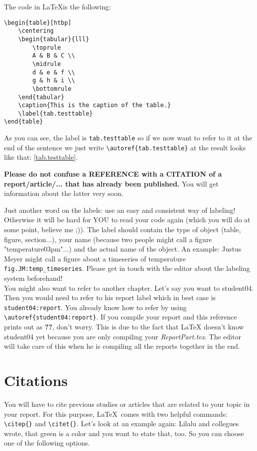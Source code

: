 \documentclass[12pt,a4paper,notitlepage]{scrreprt}
\begin{document}
The code in \LaTeX is the following:

\begin{verbatim}
\begin{table}[htbp]
    \centering
    \begin{tabular}{lll}
        \toprule
        A & B & C \\
        \midrule
        d & e & f \\
        g & h & i \\
        \bottomrule
    \end{tabular}
    \caption{This is the caption of the table.}
    \label{tab.testtable}
\end{table}
\end{verbatim}

As you can see, the label is \verb#tab.testtable# so if we now want to refer to it at the end of the sentence we just write \verb#\autoref{tab.testtable}# at the result looks like that: \autoref{tab.testtable}.

\textbf{Please do not confuse a REFERENCE with a CITATION of a report/article/... that has already been published.} You will get information about the latter very soon. 

Just another word on the labels: use an easy and consistent way of labeling! Otherwise it will be hard for YOU to read your code again (which you will do at some point, believe me ;)). The label should contain the type of object (table, figure, section...), your name (because two people might call a figure "temperature03pm"...) and the actual name of the object. An example: Justus Meyer might call a figure about a timeseries of temperature \verb#fig.JM:temp_timeseries#. Please get in touch with the editor about the labeling system beforehand!\\

You might also want to refer to another chapter. Let's say you want to student04. Then you would need to refer to his report label which in best case is \texttt{student04:report}. You already know how to refer by using \verb#\autoref{student04:report}#. If you compile your report and this reference prints out as \textbf{??}, don't worry. This is due to the fact that LaTeX doesn't know student04 yet because you are only compiling your \textit{ReportPart.tex}. The editor will take care of this when he is compiling all the reports together in the end.

\section{Citations}
\label{sec:citations}
You will have to cite previous studies or articles that are related to your topic in your report. For this purpose, \LaTeX\ comes with two helpful commands: \verb#\citep{}# and \verb#\citet{}#. Let's look at an example again: Lilalu and collegues wrote, that green is a color and you want to state that, too. So you can choose one of the following options.\\
\end{document}
